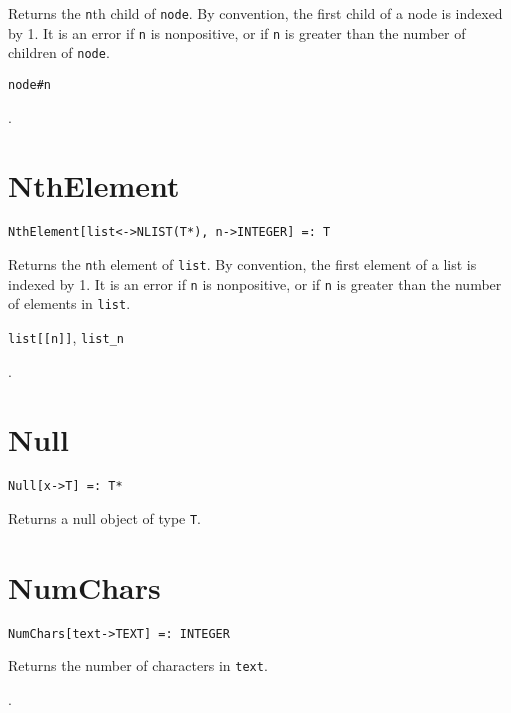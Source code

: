 \noindent
Returns the \verb+n+th child of \verb+node+.
By convention, the first child of a node is indexed by 1.
It is an error if \verb+n+ is nonpositive, or if \verb+n+ is greater
than the number of children of \verb+node+.

\shortform \verb+node#n+

\seealso {}.


\section*{NthElement}\label{PrimNthElement}
\begin{verbatim}
NthElement[list<->NLIST(T*), n->INTEGER] =: T 
\end{verbatim}
\foralltypes

\noindent
Returns the \verb+n+th element of \verb+list+.
By convention, the first element of a list is indexed by 1.
It is an error if \verb+n+ is nonpositive, or if \verb+n+ is greater
than the number of elements in \verb+list+.

\shortform \verb+list[[n]]+, \verb+list_n+

\seealso {}.


\section*{Null}\label{PrimNull}
\begin{verbatim}
Null[x->T] =: T*
\end{verbatim}
\foralltypes

\noindent
Returns a null object of type \verb+T+.  


\section*{NumChars}\label{PrimNumChars}
\begin{verbatim}
NumChars[text->TEXT] =: INTEGER 
\end{verbatim}

\noindent
Returns the number of characters in \verb+text+.

\seealso {}.


